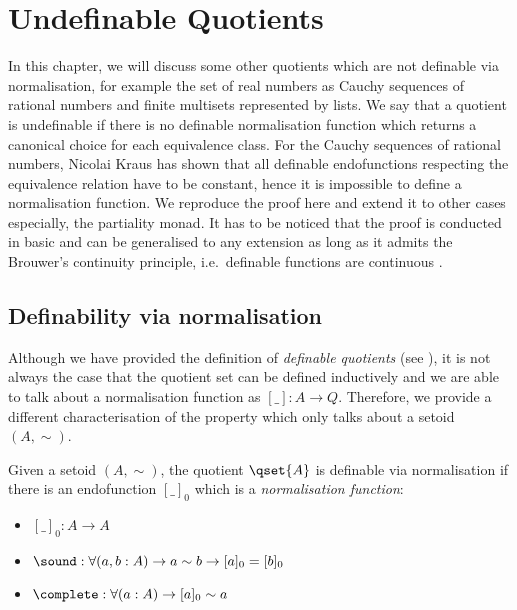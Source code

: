 \chapter{Undefinable Quotients}
\label{rl}



In this chapter, we will discuss some other quotients which are not definable via normalisation, for example the set of real numbers as Cauchy sequences of rational numbers \cite{bis:85} and finite multisets represented by lists.
We say that a quotient is undefinable if there is no definable normalisation function which returns a canonical choice for each equivalence class. 
For the Cauchy sequences of rational numbers, Nicolai Kraus \cite{non-normal} has shown that all definable endofunctions respecting the equivalence relation have to be constant, hence it is impossible to define a normalisation function. We reproduce the proof here and extend it to other cases especially, the partiality monad. It has to be noticed that the proof is conducted in basic \mltt and can be generalised to any extension as long as it admits the Brouwer's continuity principle, i.e.\ definable functions are continuous \cite{DBLP:journals/bsl/AttenD02}.




\section{Definability via normalisation}

Although we have provided the definition of \emph{definable quotients} (see ), it is not always the case that the quotient set can be defined inductively and we are able to talk about a normalisation function as $[\_] : A \to Q$. 
Therefore, we provide a different characterisation of the property which only talks about a setoid $(A,\sim)$.

\begin{definition}\label{def:nor}
Given a setoid $(A,\sim)$, the quotient $\qset{A}$ is definable via normalisation if there is an endofunction $[\_]_0$ which is a \emph{normalisation function}:

\begin{itemize}

\item $[\_]_0 : A \to A$

\item $\sound : \forall (a,b : A) \to a \sim b \to [ a ]_0 = [ b ]_0$

\item $\complete : \forall (a : A) \to [ a ]_0 \sim a$

\end{itemize}
\end{definition}

